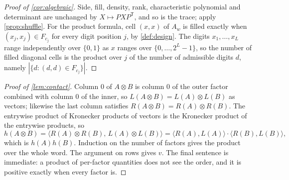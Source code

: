 \documentclass[11pt]{amsart}
\theoremstyle{definition}
\theoremstyle{remark}
\begin{document}
\begin{proof}[Proof of \cref{cor:algebraic}]
Side, fill, density, rank, characteristic polynomial and determinant are unchanged by $X \mapsto PXP^{\mathsf T}$, and so is the trace; apply \cref{prop:shuffle}. For the product formula, cell $(x,x)$ of $A_w$ is filled exactly when $(x_j,x_j) \in F_{c_j}$ for every digit position $j$, by \cref{def:design}. The digits $x_1,\dots,x_L$ range independently over $\{0,1\}$ as $x$ ranges over $\{0,\dots,2^L-1\}$, so the number of filled diagonal cells is the product over $j$ of the number of admissible digits $d$, namely $|\{d : (d,d) \in F_{c_j}\}|$.
\end{proof}

\begin{proof}[Proof of \cref{lem:contact}]
Column $0$ of $A \otimes B$ is column $0$ of the outer factor combined with column $0$ of the inner, so $L(A \otimes B) = L(A) \otimes L(B)$ as vectors; likewise the last column satisfies $R(A \otimes B) = R(A) \otimes R(B)$. The entrywise product of Kronecker products of vectors is the Kronecker product of the entrywise products, so
\[
  h(A \otimes B) = \bigl\langle R(A) \otimes R(B),\, L(A) \otimes L(B) \bigr\rangle = \bigl\langle R(A), L(A) \bigr\rangle \cdot \bigl\langle R(B), L(B) \bigr\rangle,
\]
which is $h(A)h(B)$. Induction on the number of factors gives the product over the whole word. The argument on rows gives $v$. The final sentence is immediate: a product of per-factor quantities does not see the order, and it is positive exactly when every factor is.
\end{proof}
\end{document}
